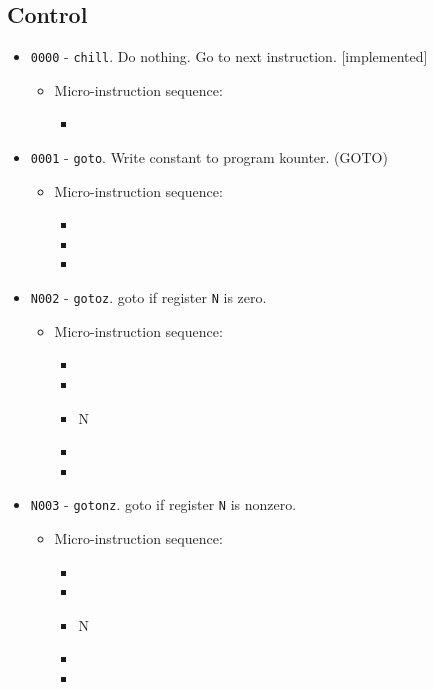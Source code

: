 \documentclass{article}
\begin{document}
\subsection{Control}
\begin{itemize}
    \item \Verb|0000| - \Verb|chill|. Do nothing. Go to next instruction. [implemented]
    \begin{itemize}
        \item Micro-instruction sequence:
        \begin{itemize}
            \item \done
        \end{itemize}
    \end{itemize}

    \item \Verb|0001| - \Verb|goto|. Write constant to program kounter. (GOTO)
    \begin{itemize}
        \item Micro-instruction sequence:
        \begin{itemize}
            \item \pkptroutinc
            \item \datatopk
            \item \done
        \end{itemize}
    \end{itemize}

    \item \Verb|N002| - \Verb|gotoz|. goto if register \Verb|N| is zero.
    \begin{itemize}
        \item Micro-instruction sequence:
        \begin{itemize}
            \item \pkptroutinc
            \item \datatotmpa
            \item \regtodata N
            \item \tmpatopkifz
            \item \done
        \end{itemize}
    \end{itemize}

    \item \Verb|N003| - \Verb|gotonz|. goto if register \Verb|N| is nonzero.
    \begin{itemize}
        \item Micro-instruction sequence:
        \begin{itemize}
            \item \pkptroutinc
            \item \datatotmpa
            \item \regtodata N
            \item \tmpatopkifnz
            \item \done
        \end{itemize}
    \end{itemize}


\end{itemize}
\end{document}
